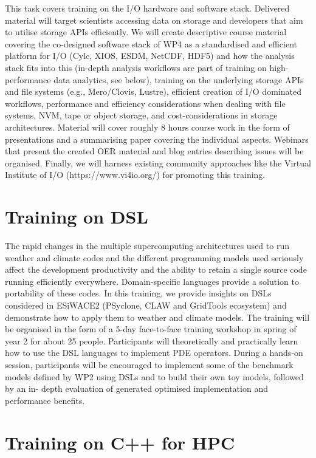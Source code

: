 This task covers training on the I/O hardware and software stack. Delivered material will target scientists accessing data on storage and developers that aim to utilise storage APIs efficiently. We will create descriptive course material covering the co-designed software stack of WP4 as a standardised and efficient platform for I/O (Cylc, XIOS, ESDM, NetCDF, HDF5) and how the analysis stack fits into this (in-depth analysis workflows are part of training on high-performance data analytics, see below), training on the underlying storage APIs and file systems (e.g., Mero/Clovis, Lustre), efficient creation of I/O dominated workflows, performance and efficiency considerations when dealing with file systems, NVM, tape or object storage, and cost-considerations in storage architectures. Material will cover roughly 8 hours course work in the form of presentations and a summarising paper covering the individual aspects. Webinars that present the created OER material and blog entries describing issues will be organised. Finally, we will harness existing community approaches like the Virtual Institute of I/O (https://www.vi4io.org/) for promoting this training.

\section{Training on DSL}

The rapid changes in the multiple supercomputing architectures used to run weather and climate codes and the different programming models used seriously affect the development productivity and the ability to retain a single source code running efficiently everywhere. Domain-specific languages provide a solution to portability of these codes. In this training, we provide insights on DSLs considered in ESiWACE2 (PSyclone, CLAW and GridTools ecosystem) and demonstrate how to apply them to weather and climate models. The training will be organised in the form of a 5-day face-to-face training workshop in spring of year 2 for about 25 people. Participants will theoretically and practically learn how to use the DSL languages to implement PDE operators. During a hands-on session, participants will be encouraged to implement some of the benchmark models defined by WP2 using DSLs and to build their own toy models, followed by an in- depth evaluation of generated optimised implementation and performance benefits.

\section{Training on C++ for HPC}

